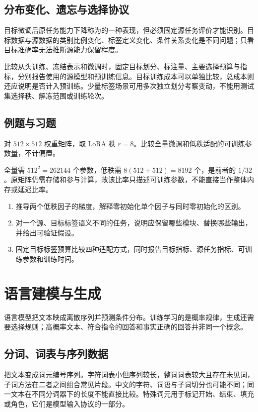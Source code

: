 \documentclass[UTF8,12pt,a4paper,fontset=fandol]{ctexbook}
\begin{document}
\section{分布变化、遗忘与选择协议}
目标微调后原任务能力下降称为的一种表现，但必须固定源任务评价才能识别。目标数据与源数据的类别比例变化、标签定义变化、条件关系变化是不同问题；只看目标准确率无法推断源能力保留程度。

比较从头训练、冻结表示和微调时，固定目标划分、标注量、主要选择预算与指标，分别报告使用的源模型和预训练信息。目标训练成本可以单独比较，总成本则还应说明是否计入预训练。少量标签场景可用多次独立划分考察变动，不能用测试集选择秩、解冻范围或训练轮次。

\section{例题与习题}
\begin{example}[低秩适配的参数量]
对 $512\times512$ 权重矩阵，取 LoRA 秩 $r=8$。比较全量微调和低秩适配的可训练参数量，不计偏置。
\end{example}
\begin{solve}
全量需 $512^2=262144$ 个参数，低秩需 $8(512+512)=8192$ 个，是前者的 $1/32$。原矩阵仍需存储和参与计算，故该比率只描述可训练参数，不能直接当作整体内存或延迟比率。
\end{solve}
\begin{enumerate}
\item 推导两个低秩因子的梯度，解释零初始化单个因子与同时零初始化的区别。
\item 对一个源、目标标签语义不同的任务，说明应保留哪些模块、替换哪些输出，并给出可验证假设。
\item 固定目标标签预算比较四种适配方式，同时报告目标指标、源任务指标、可训练参数和训练时间。
\end{enumerate}

\chapter{语言建模与生成}
\label{chap:dl-language}
语言模型把文本映成离散序列并预测条件分布。训练学习的是概率规律，生成还需要选择规则；高概率文本、符合指令的回答和事实正确的回答并非同一个概念。

\section{分词、词表与序列数据}
把文本变成词元编号序列。字符词表小但序列较长，整词词表较大且存在未见词，子词方法在二者之间组合常见片段。中文的字符、词语与子词切分也可能不同；同一文本在不同分词器下的长度不能直接比较。特殊词元用于标记开始、结束、填充或角色，它们是模型输入协议的一部分。
\end{document}

